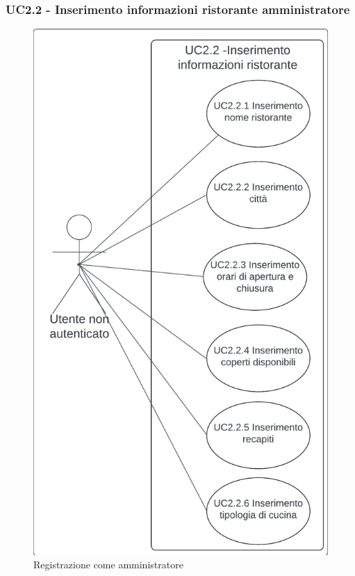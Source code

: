 \subsubsection{UC2.2 - Inserimento informazioni ristorante amministratore}\label{usecase:2_2}

\begin{figure}[H]
    \centering
    \includegraphics[scale= 0.2]{ucd/UCD2.2_finale.png}
\caption{Registrazione come amministratore}
\end{figure}

